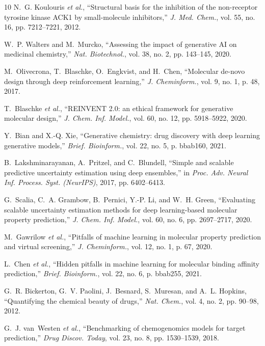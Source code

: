 \documentclass[journal]{IEEEtran}
\begin{document}
\begin{thebibliography}{10}
N.~G. Koulouris \emph{et al.}, ``Structural basis for the inhibition of the non-receptor tyrosine kinase ACK1 by small-molecule inhibitors,'' \emph{J. Med. Chem.}, vol. 55, no. 16, pp. 7212--7221, 2012.

W.~P. Walters and M.~Murcko, ``Assessing the impact of generative AI on medicinal chemistry,'' \emph{Nat. Biotechnol.}, vol. 38, no. 2, pp. 143--145, 2020.

M.~Olivecrona, T.~Blaschke, O.~Engkvist, and H.~Chen, ``Molecular de-novo design through deep reinforcement learning,'' \emph{J. Cheminform.}, vol. 9, no. 1, p. 48, 2017.

T.~Blaschke \emph{et al.}, ``REINVENT 2.0: an ethical framework for generative molecular design,'' \emph{J. Chem. Inf. Model.}, vol. 60, no. 12, pp. 5918--5922, 2020.

Y.~Bian and X.-Q. Xie, ``Generative chemistry: drug discovery with deep learning generative models,'' \emph{Brief. Bioinform.}, vol. 22, no. 5, p. bbab160, 2021.

B.~Lakshminarayanan, A.~Pritzel, and C.~Blundell, ``Simple and scalable predictive uncertainty estimation using deep ensembles,'' in \emph{Proc. Adv. Neural Inf. Process. Syst. (NeurIPS)}, 2017, pp. 6402--6413.

G.~Scalia, C.~A. Grambow, B.~Pernici, Y.-P. Li, and W.~H. Green, ``Evaluating scalable uncertainty estimation methods for deep learning-based molecular property prediction,'' \emph{J. Chem. Inf. Model.}, vol. 60, no. 6, pp. 2697--2717, 2020.

M.~Gawrilow \emph{et al.}, ``Pitfalls of machine learning in molecular property prediction and virtual screening,'' \emph{J. Cheminform.}, vol. 12, no. 1, p. 67, 2020.

L.~Chen \emph{et al.}, ``Hidden pitfalls in machine learning for molecular binding affinity prediction,'' \emph{Brief. Bioinform.}, vol. 22, no. 6, p. bbab255, 2021.

G.~R. Bickerton, G.~V. Paolini, J.~Besnard, S.~Muresan, and A.~L. Hopkins, ``Quantifying the chemical beauty of drugs,'' \emph{Nat. Chem.}, vol. 4, no. 2, pp. 90--98, 2012.

G.~J. van~Westen \emph{et al.}, ``Benchmarking of chemogenomics models for target prediction,'' \emph{Drug Discov. Today}, vol. 23, no. 8, pp. 1530--1539, 2018.


\end{thebibliography}
\end{document}
